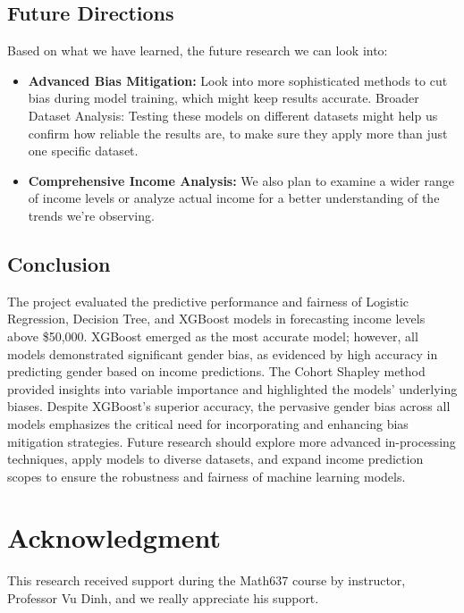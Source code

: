 \documentclass[conference]{IEEEtran}
\begin{document}
\subsection{Future Directions}
Based on what we have learned, the future research we can look into:
\begin{itemize}
    \item \textbf{Advanced Bias Mitigation:} Look into more sophisticated methods to cut bias during model training, which might keep results accurate. Broader Dataset Analysis: Testing these models on different datasets might help us confirm how reliable the results are,  to make sure they apply more than just one specific dataset.
    \item \textbf{Comprehensive Income Analysis:} We also plan to examine a wider range of income levels or analyze actual income for a better understanding of the trends we're observing.
\end{itemize}

\subsection{Conclusion}
The project evaluated the predictive performance and fairness of Logistic Regression, Decision Tree, and XGBoost models in forecasting income levels above \$50,000. XGBoost emerged as the most accurate model; however, all models demonstrated significant gender bias, as evidenced by high accuracy in predicting gender based on income predictions. The Cohort Shapley method provided insights into variable importance and highlighted the models' underlying biases. Despite XGBoost's superior accuracy, the pervasive gender bias across all models emphasizes the critical need for incorporating and enhancing bias mitigation strategies. Future research should explore more advanced in-processing techniques, apply models to diverse datasets, and expand income prediction scopes to ensure the robustness and fairness of machine learning models.



\section*{Acknowledgment}

This research received support during the Math637 course by instructor, Professor Vu Dinh, and we really appreciate his support. 
\end{document}
